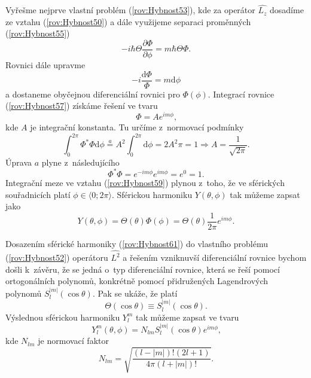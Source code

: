 Vyřešme nejprve vlastní problém (\ref{rov:Hybnost53}), kde za operátor $\hat{L_z}$ dosadíme ze vztahu (\ref{rov:Hybnost50}) a dále využijeme separaci proměnných (\ref{rov:Hybnost55})
\begin{equation}
-i \hbar \Theta \frac{\partial \Phi}{\partial \phi} = m \hbar \Theta \Phi \mbox{.}
\label{rov:Hybnost56}
\end{equation}
Rovnici dále upravme
\begin{equation}
-i  \frac{\mathrm{d} \Phi}{\Phi} = m \mathrm{d} \phi
\label{rov:Hybnost57}
\end{equation}
a dostaneme obyčejnou diferenciální rovnici pro $\Phi(\phi)$. Integrací rovnice (\ref{rov:Hybnost57}) získáme řešení ve tvaru
\begin{equation}
\Phi = A e^{i m \phi} \mbox{,}
\label{rov:Hybnost58}
\end{equation}
kde $A$ je integrační konstanta. Tu určíme z~normovací podmínky
\begin{equation}
\int_{0}^{2\pi} \Phi^{\ast}\Phi \mathrm{d} \phi \stackrel{a}{=} A^2 \int_{0}^{2\pi} \mathrm{d} \phi = 2 A^2 \pi = 1 \Rightarrow A = \frac{1}{\sqrt{2 \pi}} \mbox{.}
\label{rov:Hybnost59}
\end{equation}
Úprava $a$ plyne z~následujícího
\begin{equation}
\Phi^{\ast}\Phi = e^{-i m \phi}e^{i m \phi}=e^0=1 \mbox{.}
\label{rov:Hybnost60}
\end{equation}
Integrační meze ve vztahu (\ref{rov:Hybnost59}) plynou z~toho, že ve sférických souřadnicích platí $\phi \in \langle 0;2\pi\rangle$. Sférickou harmoniku $Y(\theta, \phi)$ tak můžeme zapsat jako
\begin{equation}
Y(\theta, \phi) = \Theta(\theta) \Phi(\phi) = \Theta(\theta) \frac{1}{2\pi}e^{im\phi} \mbox{.}
\label{rov:Hybnost61}
\end{equation}

Dosazením sférické harmoniky (\ref{rov:Hybnost61}) do vlastního problému (\ref{rov:Hybnost52}) operátoru $\hat{L^2}$ a řešením vzniknuvší diferenciální rovnice bychom došli k~závěru, že se jedná o~typ diferenciální rovnice, která se řeší pomocí ortogonálních polynomů, konkrétně pomocí přidružených Lagendrových polynomů $S_l^{|m|}(\cos \theta)$. Pak se ukáže, že platí
\begin{equation}
\Theta(\cos \theta) \equiv S_l^{|m|} (\cos \theta) \mbox{.}
\label{rov:Hybnost62}
\end{equation}
Výslednou sférickou harmoniku $Y_l^{m}$ tak můžeme zapsat ve tvaru
\begin{equation}
\boxed{Y_l^{m}(\theta, \phi) = N_{lm} S_l^{|m|} (\cos \theta) e^{i m \phi} \mbox{,}}
\label{rov:Hybnost63}
\end{equation}
kde $N_{lm}$ je normovací faktor
\begin{equation}
N_{lm} = \sqrt{\frac{(l-|m|)! (2l+1)}{4\pi(l+|m|)!}}\mbox{.}
\label{rov:Hybnost64}
\end{equation}

